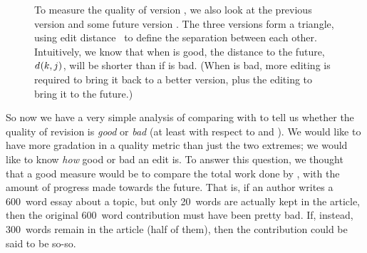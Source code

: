 \begin{figure}[t]
\centering
{}
\hspace{1ex}
\caption{To measure the quality of version , we also
	look at the previous version  and some future
	version .
	The three versions form a triangle, using
	edit distance~\cite{Levenshtein66} to define the separation
	between each other.
	Intuitively, we know that when  is good,
	the distance to the future, $d_{}(k, j)$,
	will be shorter than if  is bad.
	(When  is bad, more editing is required to
	bring it back to a better version, plus the editing
	to bring it to the future.)
}
\label{fig-editcontr}
\end{figure}

So now we have a very simple analysis of comparing
 with  to tell us whether the
quality of revision  is \textit{good} or \textit{bad}
(at least with respect to  and ).
We would like to have more gradation in a quality metric than
just the two extremes; we would like to know \textit{how} good
or bad an edit is.
To answer this question, we thought that a good measure would
be to compare the total work done by ,
with the amount of progress made towards the future.
That is, if an author writes a 600~word essay about a topic,
but only 20~words are actually kept in the article, then the
original 600~word contribution must have been pretty bad.
If, instead, 300~words remain in the article (half of them),
then the contribution could be said to be so-so.

